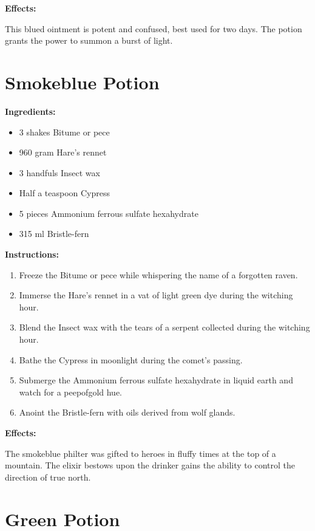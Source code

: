 \documentclass{article}
\begin{document}
\textbf{Effects:}

This blued ointment is potent and confused, best used for two days. The potion grants the power to summon a burst of light.

\newpage
\section*{Smokeblue Potion}

\textbf{Ingredients:}

\begin{itemize}
  \item 3 shakes Bitume or pece
  \item 960 gram Hare's rennet
  \item 3 handfuls Insect wax
  \item Half a teaspoon Cypress
  \item 5 pieces Ammonium ferrous sulfate hexahydrate
  \item 315 ml Bristle-fern
\end{itemize}

\textbf{Instructions:}

\begin{enumerate}
  \item Freeze the Bitume or pece while whispering the name of a forgotten raven.
  \item Immerse the Hare's rennet in a vat of light green dye during the witching hour.
  \item Blend the Insect wax with the tears of a serpent collected during the witching hour.
  \item Bathe the Cypress in moonlight during the comet’s passing.
  \item Submerge the Ammonium ferrous sulfate hexahydrate in liquid earth and watch for a peepofgold hue.
  \item Anoint the Bristle-fern with oils derived from wolf glands.
\end{enumerate}

\textbf{Effects:}

The smokeblue philter was gifted to heroes in fluffy times at the top of a mountain. The elixir bestows upon the drinker gains the ability to control the direction of true north.

\newpage
\section*{Green Potion}
\end{document}
